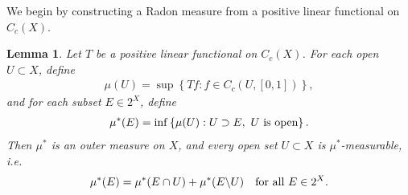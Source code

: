\documentclass{article}
\numberwithin{equation}{section}
\theoremstyle{plain}
\newtheorem{lemma}[theorem]{Lemma}
\theoremstyle{definition}
\begin{document}
We begin by constructing a Radon measure from a positive linear functional on $C_c(X)$.
\begin{lemma}\label{radonrieszlemma1}
	Let $T$ be a positive linear functional on $C_c(X)$. For each open $U\subset X$, define
	\begin{align*}
		\mu(U)=\sup\left\{Tf:f\in C_c(U,[0,1])\right\},
	\end{align*}
	and for each subset $E\in 2^X$, define
	\begin{align}
		\mu^*(E)=\inf\left\{\mu(U):U\supset E,\ U\ \text{\rm is open}\right\}.\label{radonouterreg}
	\end{align}
	Then $\mu^*$ is an outer measure on $X$, and every open set $U\subset X$ is $\mu^*$-measurable, i.e.
	\begin{align}
		\mu^*(E)=\mu^*(E\cap U)+\mu^*(E\backslash U)\quad\text{\rm for all}\ E\in 2^X.\label{caratheodory}
	\end{align}
\end{lemma}
\end{document}
